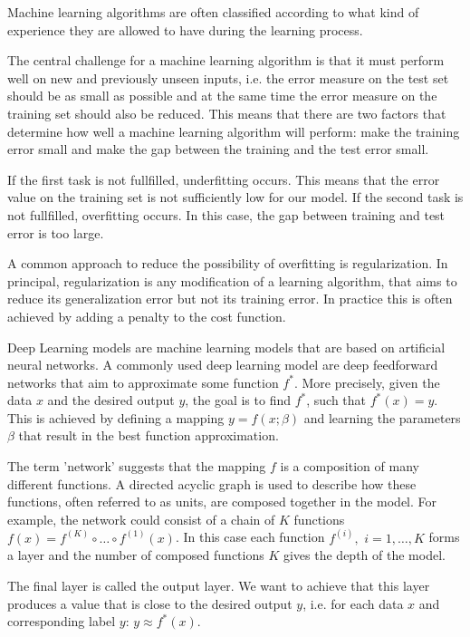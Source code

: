 \documentclass[12pt, a4paper]{article}
\theoremstyle{definition}
\theoremstyle{plain}
\numberwithin{equation}{section}
\numberwithin{figure}{section}
\numberwithin{table}{section}
\begin{document}
	Machine learning algorithms are often classified according to what kind of experience they are allowed to have during the learning process.

	The central challenge for a machine learning algorithm is that it must perform well on new and previously unseen inputs, i.e. the error measure on the test set should be as small as possible and at the same time the error measure on the training set should also be reduced.
	This means that there are two factors that determine how well a machine learning algorithm will perform:
	make the training error small and make the gap between the training and the test error small.
	
	If the first task is not fullfilled, underfitting occurs. This means that the error value on the training set is not sufficiently low for our model.
	If the second task is not fullfilled, overfitting occurs. In this case, the gap between training and test error is too large.
	
	A common approach to reduce the possibility of overfitting is regularization.
	In principal, regularization is any modification of a learning algorithm, that aims to reduce its generalization error but not its training error.
	In practice this is often achieved by adding a penalty to the cost function.
	
	Deep Learning models are machine learning models that are based on artificial neural networks.
	A commonly used deep learning model are deep feedforward networks that aim to approximate some function $f^*$.
	More precisely, given the data $x$ and the desired output $y$, the goal is to find $f^*$, such that $f^*(x)=y$.
	This is achieved by defining a mapping $y = f(x; \beta)$ and learning the parameters $\beta$ that result in the best function approximation.
	
	The term 'network' suggests that the mapping $f$ is a composition of many different functions.
	A directed acyclic graph is used to describe how these functions, often referred to as units, are composed together in the model.
	For example, the network could consist of a chain of $K$ functions $ f(x) = f^{(K)}\circ \dots \circ f^{(1)}(x)$.
	In this case each function $f^{(i)},$ $i=1,\dots,K$ forms a layer and the number of composed functions $K$ gives the depth of the model.
	
	The final layer is called the output layer.
	We want to achieve that this layer produces a value that is close to the desired output $y$, i.e. for each data $x$ and corresponding label $y$: $y \approx f^*(x)$.
	
\end{document}
